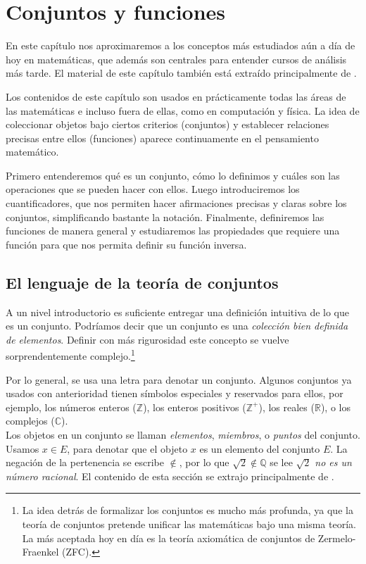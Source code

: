 \documentclass[12pt]{book}
\begin{document}
\chapter{Conjuntos y funciones}
\noindent
En este capítulo nos aproximaremos a los conceptos más estudiados aún a día de hoy en matemáticas, que además son centrales para entender cursos de análisis más tarde. El material de este capítulo también está extraído principalmente de \cite{eccles2013introduction}.

Los contenidos de este capítulo son usados en prácticamente todas las áreas de las matemáticas e incluso fuera de ellas, como en computación y física. La idea de coleccionar objetos bajo ciertos criterios (conjuntos) y establecer relaciones precisas entre ellos (funciones) aparece continuamente en el pensamiento matemático.

Primero entenderemos qué es un conjunto, cómo lo definimos y cuáles son las operaciones que se pueden hacer con ellos. Luego introduciremos los cuantificadores, que nos permiten hacer afirmaciones precisas y claras sobre los conjuntos, simplificando bastante la notación. Finalmente, definiremos las funciones de manera general y estudiaremos las propiedades que requiere una función para que nos permita definir su función inversa.

\section{El lenguaje de la teoría de conjuntos}
\noindent
A un nivel introductorio es suficiente entregar una definición intuitiva de lo que es un conjunto. Podríamos decir que un conjunto es una \textit{colección bien definida de elementos}. Definir con más rigurosidad este concepto se vuelve sorprendentemente complejo.\footnote{La idea detrás de formalizar los conjuntos es mucho más profunda, ya que la teoría de conjuntos pretende unificar las matemáticas bajo una misma teoría. La más aceptada hoy en día es la teoría axiomática de conjuntos de Zermelo-Fraenkel (ZFC).}

Por lo general, se usa una letra para denotar un conjunto. Algunos conjuntos ya usados con anterioridad tienen símbolos especiales y reservados para ellos, por ejemplo, los números enteros ($\mathbb{Z}$), los enteros positivos ($\mathbb{Z^+}$), los reales ($\mathbb{R}$), o los complejos ($\mathbb{C}$).\\

Los objetos en un conjunto se llaman \textit{elementos}, \textit{miembros}, o \textit{puntos} del conjunto. Usamos $x\in E$, para denotar que el objeto $x$ es un elemento del conjunto $E$. La negación de la pertenencia se escribe $\notin$, por lo que $\sqrt{2}\notin \mathbb{Q}$ se lee \textit{$\sqrt{2}$ no es un número racional}. El contenido de esta sección se extrajo principalmente de \cite[Part II, Chapter 6]{eccles2013introduction}.
\end{document}
